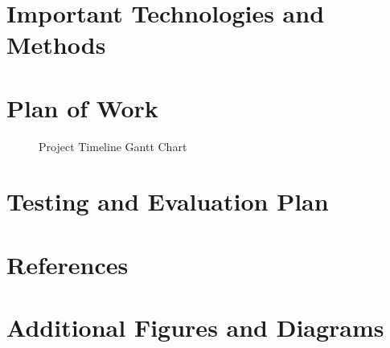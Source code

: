 \documentclass{article}
\begin{document}
\section{Important Technologies and Methods}


\section{Plan of Work}


\begin{figure}[H]
    \centering
    \caption{Project Timeline Gantt Chart}
    \label{fig:gantt}
\end{figure}

\section{Testing and Evaluation Plan}


\newpage

\appendix

\section{References}



\section{Additional Figures and Diagrams}
\end{document}

